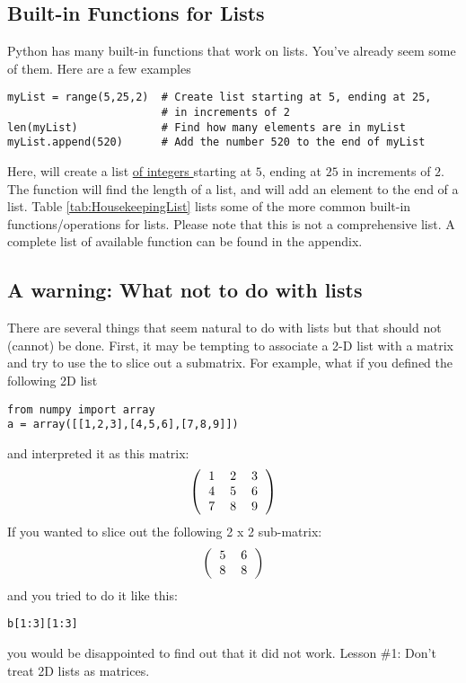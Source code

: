 \subsection*{Built-in Functions for Lists}
Python has many built-in functions that work on lists.  You've already
seem some of them.  Here are a few examples
\begin{Verbatim}
myList = range(5,25,2)  # Create list starting at 5, ending at 25,
                        # in increments of 2
len(myList)             # Find how many elements are in myList
myList.append(520)      # Add the number 520 to the end of myList
\end{Verbatim}
 Here,  will create a list \underline{of integers }
starting at $5$, ending at $25$ in increments of $2$.  The
 function will find the length of a list, and
 will add an element to the end of a list.  Table
\ref{tab:HousekeepingList} lists some of the more common built-in
functions/operations for lists.  Please note that this is not a
comprehensive list.  A complete list of available function can be
found in the appendix.


\subsection*{A warning: What not to do with lists}
There are several things that seem natural to do with lists but that
should not (cannot) be done.  First, it may be tempting to associate a
2-D list with a matrix and try to use the \code{:} to slice out a
submatrix.  For example, what if you defined the following 2D list
\begin{Verbatim}
from numpy import array
a = array([[1,2,3],[4,5,6],[7,8,9]])
\end{Verbatim}
and interpreted it as this matrix:
\begin{equation}
\left( \begin{tabular}{ccc}
1 & 2 & 3\\
4 & 5 & 6\\
7 & 8 & 9\\
\end{tabular}
\right)
\end{equation}
If you wanted to slice out the following 2 x 2 sub-matrix:
\begin{equation}
\left(\begin{tabular}{cc}
5 & 6 \\
8 & 8 \\
\end{tabular}
\right)
\end{equation}
and you tried to do it like this:
\begin{Verbatim}
b[1:3][1:3] 
\end{Verbatim}
you would be disappointed to find out that it did not work.  Lesson
\#1: Don't treat 2D lists as matrices.

